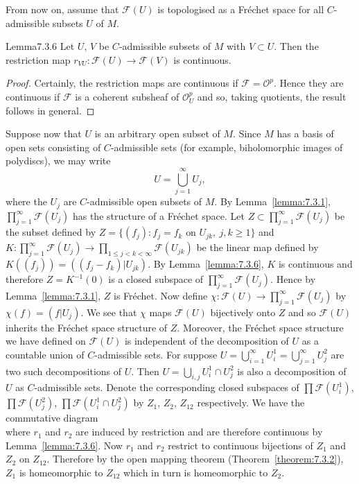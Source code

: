 From now on, assume that $\mathcal F(U)$ is topologised as a Fr\'echet space for all $C$-admissible subsets $U$ of $M$.
\begin{originaltheorem}{Lemma}{7.3.6}
Let $U$, $V$ be $C$-admissible subsets of $M$ with $V\subset U$. Then the restriction map $r_{VU}:\mathcal F(U)\to\mathcal F(V)$ is continuous.
\end{originaltheorem}
\begin{proof}
Certainly, the restriction maps are continuous if $\mathcal F=\mathcal O^p$. Hence they are continuous if $\mathcal F$ is a coherent subsheaf of $\mathcal O_U^p$ and so, taking quotients, the result follows in general.
\end{proof}
Suppose now that $U$ is an arbitrary open subset of $M$. Since $M$ has a basis of open sets consisting of $C$-admissible sets (for example, biholomorphic images of polydiscs), we may write
\[
U=\bigcup_{j=1}^\infty U_j,
\]
where the $U_j$ are $C$-admissible open subsets of $M$. By Lemma~\ref{lemma:7.3.1}, $\prod_{j=1}^\infty\mathcal F(U_j)$ has the structure of a Fr\'echet space. Let $Z\subset\prod_{j=1}^\infty\mathcal F(U_j)$ be the subset defined by $Z=\{(f_j):f_j=f_k\text{ on }U_{jk},\ j,k\geq1\}$ and $K:\prod_{j=1}^\infty\mathcal F(U_j)\to\prod_{1\leq j<k<\infty}\mathcal F(U_{jk})$ be the linear map defined by $K((f_j))=((f_j-f_k)|U_{jk})$. By Lemma~\ref{lemma:7.3.6}, $K$ is continuous and therefore $Z=K^{-1}(0)$ is a closed subspace of $\prod_{j=1}^\infty\mathcal F(U_j)$. Hence by Lemma~\ref{lemma:7.3.1}, $Z$ is Fr\'echet. Now define $\chi:\mathcal F(U)\to\prod_{j=1}^\infty\mathcal F(U_j)$ by $\chi(f)=(f|U_j)$.
We see that $\chi$ maps $\mathcal F(U)$ bijectively onto $Z$ and so $\mathcal F(U)$ inherits the Fr\'echet space structure of $Z$. Moreover, the Fr\'echet space structure we have defined on $\mathcal F(U)$ is independent of the decomposition of $U$ as a countable union of $C$-admissible sets. For suppose $U=\bigcup_{i=1}^\infty U_i^1=\bigcup_{j=1}^\infty U_j^2$ are two such decompositions of $U$. Then $U=\bigcup_{i,j}U_i^1\cap U_j^2$ is also a decomposition of $U$ as $C$-admissible sets. Denote the corresponding closed subspaces of $\prod\mathcal F(U_i^1)$, $\prod\mathcal F(U_j^2)$, $\prod\mathcal F(U_i^1\cap U_j^2)$ by $Z_1$, $Z_2$, $Z_{12}$ respectively. We have the commutative diagram
\[

\]
where $r_1$ and $r_2$ are induced by restriction and are therefore continuous by Lemma~\ref{lemma:7.3.6}. Now $r_1$ and $r_2$ restrict to continuous bijections of $Z_1$ and $Z_2$ on $Z_{12}$. Therefore by the open mapping theorem (Theorem~\ref{theorem:7.3.2}), $Z_1$ is homeomorphic to $Z_{12}$ which in turn is homeomorphic to $Z_2$.

